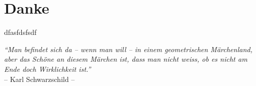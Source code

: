 \chapter*{Danke}

dfasfdsfsdf

\newpage
\thispagestyle{empty}
\vspace*{10cm}
\noindent
\textit{"`Man befindet sich da -- wenn man will -- in einem
geometrischen Märchenland, aber das Schöne an diesem Märchen
ist, dass man nicht weiss, ob es nicht am Ende doch
Wirklichkeit ist."'} \\
-- Karl Schwarzschild --
